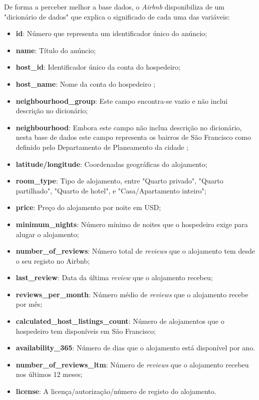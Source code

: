 \documentclass[a4paper, justified]{tufte-handout}\usepackage[]{graphicx}\usepackage[]{xcolor}
\begin{document}
De forma a perceber melhor a base dados, o \textit{Airbnb} disponibiliza de um "dicionário de dados"\cite{DicDadosAirBnb} que explica o significado de cada uma das variáveis:

\begin{itemize}
  \item \textbf{id}: Número que representa um identificador único do anúncio;
  \item \textbf{name}: Título do anúncio;
  \item \textbf{host\_id}: Identificador único da conta do hospedeiro;
  \item \textbf{host\_name}: Nome da conta do hospedeiro ;
  \item \textbf{neighbourhood\_group}: Este campo encontra-se vazio e não inclui descrição no dicionário;
  \item \textbf{neighbourhood}: Embora este campo não inclua descrição no dicionário, nesta base de dados este campo representa os bairros de São Francisco como definido pelo Departamento de Planeamento da cidade ;
  \item \textbf{latitude/longitude}: Coordenadas geográficas do alojamento;
  \item \textbf{room\_type}: Tipo de alojamento, entre "Quarto privado", "Quarto partilhado", "Quarto de hotel", e "Casa/Apartamento inteiro";
  \item \textbf{price}: Preço do alojamento por noite em USD;
  \item \textbf{minimum\_nights}: Número mínimo de noites que o hospedeiro exige para alugar o alojamento;
  \item \textbf{number\_of\_reviews}: Número total de \textit{reviews} que o alojamento tem desde o seu registo no Airbnb;
  \item \textbf{last\_review}: Data da última \textit{review} que o alojamento recebeu;
  \item \textbf{reviews\_per\_month}: Número médio de \textit{reviews} que o alojamento recebe por mês;
  \item \textbf{calculated\_host\_listings\_count}: Número de alojamentos que o hospedeiro tem disponíveis em São Francisco;
  \item \textbf{availability\_365}: Número de dias que o alojamento está disponível por ano.
  \item \textbf{number\_of\_reviews\_ltm}: Número de \textit{reviews} que o alojamento recebeu nos últimos 12 meses;
  \item \textbf{license}: A licença/autorização/número de registo do alojamento.
\end{itemize}
\end{document}
